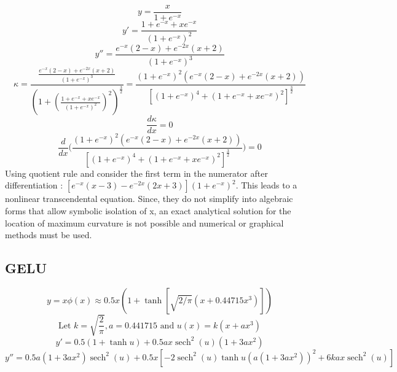 \documentclass[manuscript, screen, review]{jair}
\begin{document}
\begin{displaymath}
y = \frac{x}{1 + e^{-x}}
\end{displaymath}
\begin{displaymath}
y' = \frac{1 + e^{-x} + xe^{-x}}{(1 + e^{-x})^2}
\end{displaymath}
\begin{displaymath}
y'' = \frac{e^{-x}(2 - x) + e^{-2x}(x+2)}{(1 + e^{-x})^3}
\end{displaymath}
\begin{displaymath}
\kappa = \frac{\frac{e^{-x}(2 - x) + e^{-2x}(x+2)}{(1 + e^{-x})^3}}{(1 + (\frac{1 + e^{-x} + xe^{-x}}{(1 + e^{-x})^2})^2)^\frac{3}{2}}
= \frac{(1 + e^{-x})^2(e^{-x}(2 - x) + e^{-2x}(x+2))}{[(1 + e^{-x})^4 + (1 + e^{-x} + xe^{-x})^2]^\frac{3}{2}}
\end{displaymath}
\begin{displaymath}
\frac{d \kappa}{dx} = 0
\end{displaymath}
\begin{displaymath}
\frac{d}{dx}\biggr(\frac{(1 + e^{-x})^2(e^{-x}(2 - x) + e^{-2x}(x+2))}{[(1 + e^{-x})^4 + (1 + e^{-x} + xe^{-x})^2]^\frac{3}{2}}\biggr) = 0
\end{displaymath}
Using quotient rule and consider the first term in the numerator after differentiation :
$[e^{-x}(x-3)-e^{-2x}(2x+3)](1+e^{-x})^2$. This leads to a nonlinear 
transcendental equation. Since, they do not simplify into algebraic 
forms that allow symbolic isolation of x, an exact analytical solution for the location of 
maximum curvature is not possible and numerical or graphical methods must be used.

\subsection{GELU}\label{app:gelu}

\begin{displaymath}
y = x \phi(x) \approx 0.5x(1 + \tanh [\sqrt{2 / \pi}(x + 0.44715 x^3)])
\end{displaymath}
\begin{displaymath}
\text{Let }k = \sqrt{\frac{2}{\pi}}, a = 0.441715 \text{ and }u(x) = k(x + ax^3)
\end{displaymath}
\begin{displaymath}
y' = 0.5(1 + \tanh{u}) + 0.5ax\operatorname{sech}^2(u)(1 + 3ax^2)
\end{displaymath}
\begin{displaymath}
y'' = 0.5a(1 + 3ax^2)\operatorname{sech}^2(u) + 0.5x[-2\operatorname{sech}^2(u)\tanh{u}(a(1 + 3ax^2))^2 + 6kax\operatorname{sech}^2(u)]
\end{displaymath}
\end{document}
